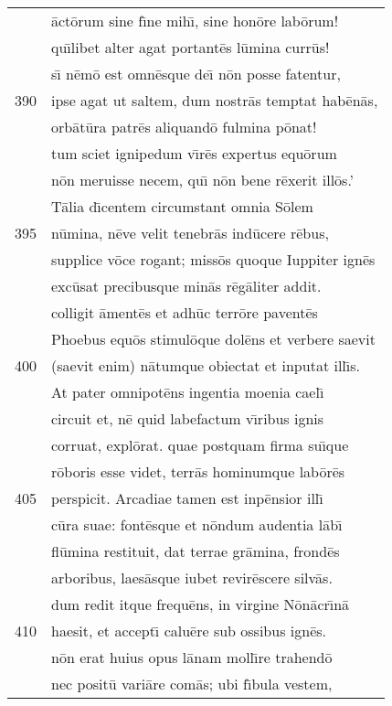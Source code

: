 \documentclass[paper=6in:9in,pagesize=pdftex,
               headinclude=on,footinclude=on,12pt]{scrbook}
\begin{document}
\begin{longtable}[p]{ r l }
 & \=act\=orum sine f\={\i}ne mih\={\i}, sine hon\=ore lab\=orum!\\ 
 & qu\={\i}libet alter agat portant\=es l\=umina curr\=us!\\ 
 & s\={\i} n\=em\=o est omn\=esque de\={\i} n\=on posse fatentur,\\ 
390 & ipse agat ut saltem, dum nostr\=as temptat hab\=en\=as,\\ 
 & orb\=at\=ura patr\=es aliquand\=o fulmina p\=onat!\\ 
 & tum sciet ignipedum v\={\i}r\=es expertus equ\=orum\\ 
 & n\=on meruisse necem, qu\={\i} n\=on bene r\=exerit ill\=os.'\\ 
 & \indent T\=alia d\={\i}centem circumstant omnia S\=olem\\ 
395 & n\=umina, n\=eve velit tenebr\=as ind\=ucere r\=ebus,\\ 
 & supplice v\=oce rogant; miss\=os quoque Iuppiter ign\=es\\ 
 & exc\=usat precibusque min\=as r\=eg\=aliter addit.\\ 
 & colligit \=ament\=es et adh\=uc terr\=ore pavent\=es\\ 
 & Phoebus equ\=os stimul\=oque dol\=ens et verbere saevit\\ 
400 & (saevit enim) n\=atumque obiectat et inputat ill\={\i}s.\\ 
 & \indent At pater omnipot\=ens ingentia moenia cael\={\i}\\ 
 & circuit et, n\=e quid labefactum v\={\i}ribus ignis\\ 
 & corruat, expl\=orat. quae postquam firma su\={\i}que\\ 
 & r\=oboris esse videt, terr\=as hominumque lab\=or\=es\\ 
405 & perspicit. Arcadiae tamen est inp\=ensior ill\={\i}\\ 
 & c\=ura suae: font\=esque et n\=ondum audentia l\=ab\={\i}\\ 
 & fl\=umina restituit, dat terrae gr\=amina, frond\=es\\ 
 & arboribus, laes\=asque iubet revir\=escere silv\=as.\\ 
 & dum redit itque frequ\=ens, in virgine N\=on\=acr\={\i}n\=a\\ 
410 & haesit, et accept\={\i} calu\=ere sub ossibus ign\=es.\\ 
 & n\=on erat huius opus l\=anam moll\={\i}re trahend\=o\\ 
 & nec posit\=u vari\=are com\=as; ubi f\={\i}bula vestem,\\ 

\end{longtable}
\end{document}
